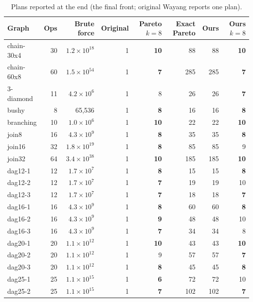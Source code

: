 \documentclass[10pt,a4paper]{article}
\begin{document}
\begin{longtable}{@{}lrr|rrrrr@{}}
\caption{Plans reported at the end (the final front; original Wayang reports one plan).}\label{tab:final}\\
\toprule
Graph & Ops & Brute force & Original & Pareto $k{=}8$ & Exact Pareto & \textbf{Ours} & Ours $k{=}8$\\
\midrule\endhead
chain-30x4 & 30 & $1.2\times10^{18}$ & 1 & \textbf{10} & 88 & 88 & \textbf{10}\\
chain-60x8 & 60 & $1.5\times10^{54}$ & 1 & \textbf{7} & 285 & 285 & \textbf{7}\\
3-diamond & 11 & $4.2\times10^{6}$ & 1 & 8 & 26 & 26 & \textbf{7}\\
bushy & 8 & 65{,}536 & 1 & \textbf{8} & 16 & 16 & \textbf{8}\\
branching & 10 & $1.0\times10^{6}$ & 1 & \textbf{10} & 22 & 22 & \textbf{10}\\
join8 & 16 & $4.3\times10^{9}$ & 1 & \textbf{8} & 35 & 35 & \textbf{8}\\
join16 & 32 & $1.8\times10^{19}$ & 1 & \textbf{8} & 85 & 85 & 9\\
join32 & 64 & $3.4\times10^{38}$ & 1 & \textbf{10} & 185 & 185 & \textbf{10}\\
dag12-1 & 12 & $1.7\times10^{7}$ & 1 & \textbf{8} & 15 & 15 & \textbf{8}\\
dag12-2 & 12 & $1.7\times10^{7}$ & 1 & \textbf{7} & 19 & 19 & 10\\
dag12-3 & 12 & $1.7\times10^{7}$ & 1 & \textbf{7} & 18 & 18 & \textbf{7}\\
dag16-1 & 16 & $4.3\times10^{9}$ & 1 & \textbf{8} & 60 & 60 & \textbf{8}\\
dag16-2 & 16 & $4.3\times10^{9}$ & 1 & \textbf{9} & 48 & 48 & 10\\
dag16-3 & 16 & $4.3\times10^{9}$ & 1 & \textbf{7} & 34 & 34 & 8\\
dag20-1 & 20 & $1.1\times10^{12}$ & 1 & \textbf{10} & 43 & 43 & \textbf{10}\\
dag20-2 & 20 & $1.1\times10^{12}$ & 1 & 9 & 57 & 57 & \textbf{7}\\
dag20-3 & 20 & $1.1\times10^{12}$ & 1 & \textbf{8} & 45 & 45 & \textbf{8}\\
dag25-1 & 25 & $1.1\times10^{15}$ & 1 & \textbf{6} & 72 & 72 & 10\\
dag25-2 & 25 & $1.1\times10^{15}$ & 1 & \textbf{7} & 102 & 102 & \textbf{7}\\
\bottomrule
\end{longtable}
\end{document}
